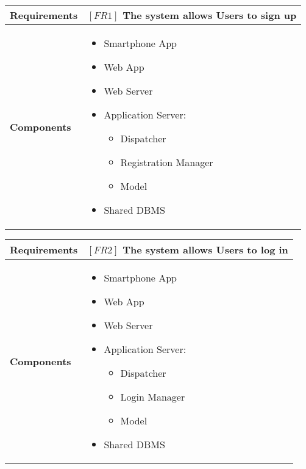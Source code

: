 \documentclass{article}
\begin{document}
\begin{table}[H]
 \renewcommand{\arraystretch}{1.5}
    \centering
    \begin{tabular}{|l|p{10cm}|}
        \hline
        \textbf{Requirements} & $[FR1]$ The system allows Users to sign up \\
        \hline
        \textbf{Components} & 
        \begin{itemize}[align=left, topsep=0pt, partopsep=0pt]
            \item Smartphone App
            \item Web App
            \item Web Server
            \item Application Server:
            \begin{itemize}
                \item Dispatcher
                \item Registration Manager
                \item Model
            \end{itemize}
            \item Shared DBMS 
        \end{itemize} \\
        \hline
    \end{tabular}
\end{table}

\begin{table}[H]
 \renewcommand{\arraystretch}{1.5}
    \centering
    \begin{tabular}{|l|p{10cm}|}
        \hline
        \textbf{Requirements} & $[FR2]$ The system allows Users to log in \\
        \hline
        \textbf{Components} & 
        \begin{itemize}[align=left, topsep=0pt, partopsep=0pt]
            \item Smartphone App
            \item Web App
            \item Web Server
            \item Application Server:
            \begin{itemize}
                \item Dispatcher
                \item Login Manager
                \item Model
            \end{itemize}
            \item Shared DBMS 
        \end{itemize} \\
        \hline
    \end{tabular}
\end{table}
\end{document}
